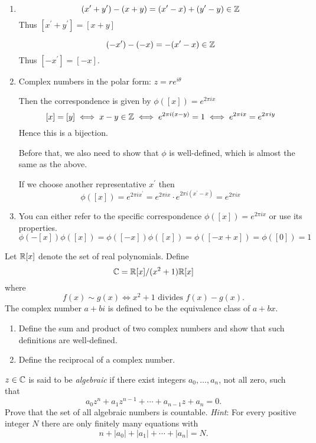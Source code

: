\begin{solution} \ 
\begin{enumerate}[label=(\alph*)]
\item 
\[ (x^\prime+y^\prime)-(x+y)=(x^\prime-x)+(y^\prime-y)\in \mathbb Z \]
Thus $[x^\prime+y^\prime]=[x+y]$

\[ (-x^\prime)-(-x)=-(x^\prime-x)\in \mathbb Z \]
Thus $[-x^\prime]=[-x]$.

\item Complex numbers in the polar form: $z=re^{i\theta}$

Then the correspondence is given by $\phi([x])=e^{2\pi ix}$
\[ [x]=[y] \iff x-y\in \mathbb Z \iff e^{2\pi i(x-y)}=1 \iff e^{2\pi ix}=e^{2\pi iy} \]
Hence this is a bijection.

Before that, we also need to show that $\phi$ is well-defined, which is almost the same as the above.

If we choose another representative $x^\prime$ then
\[ \phi([x])=e^{2\pi ix^\prime} = e^{2\pi ix}\cdot e^{2\pi i(x^\prime-x)} = e^{2\pi ix} \]

\item You can either refer to the specific correspondence $\phi([x])=e^{2\pi ix}$ or use its properties.
\[ \phi(-[x])\phi([x]) = \phi([-x])\phi([x]) = \phi([-x+x]) = \phi([0]) = 1 \]
\end{enumerate}
\end{solution}

\begin{exercise}
Let $\mathbb R[x]$ denote the set of real polynomials. Define
\[ \mathbb C=\mathbb R[x]/(x^2+1)\mathbb R[x] \]
where
\[ f(x)\sim g(x) \iff x^2+1 \text{ divides } f(x)-g(x). \]
The complex number $a+bi$ is defined to be the equivalence class of $a+bx$.
\begin{enumerate}[label=(\alph*)]
\item Define the sum and product of two complex numbers and show that such definitions are well-defined.
\item Define the reciprocal of a complex number.
\end{enumerate}
\end{exercise}

\begin{exercise}
$z\in\mathbb C$ is said to be \emph{algebraic} if there exist integers $a_0,\dots,a_n$, not all zero, such that
\[a_0z^n+a_1z^{n-1}+\cdots+a_{n-1}z+a_n=0.\]
Prove that the set of all algebraic numbers is countable. \emph{Hint}: For every positive integer $N$ there are only finitely many equations with
\[n+|a_0|+|a_1|+\cdots+|a_n|=N.\]
\end{exercise}

